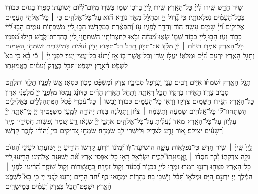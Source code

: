 {
שִׁ֣יר חָדָ֑שׁ שִׁ֥ירוּ לַ֝ייָ֗ כׇּל־הָאָֽרֶץ׃
שִׁ֣ירוּ לַ֭ייָ בָּרְכ֣וּ שְׁמ֑וֹ בַּשְּׂר֥וּ מִיּֽוֹם־לְ֝י֗וֹם יְשׁוּעָתֽוֹ׃
סַפְּר֣וּ בַגּוֹיִ֣ם כְּבוֹד֑וֹ בְּכׇל־הָ֝עַמִּ֗ים נִפְלְאוֹתָֽיו׃
כִּ֥י גָ֘ד֤וֹל יְיָ֣ וּמְהֻלָּ֣ל מְאֹ֑ד נוֹרָ֥א ה֗֝וּא עַל־כׇּל־אֱלֹהִֽים׃
כִּ֤י ׀ כׇּל־אֱלֹהֵ֣י הָעַמִּ֣ים אֱלִילִ֑ים וַ֝ייָ֗ שָׁמַ֥יִם עָשָֽׂה׃
הוֹד־וְהָדָ֥ר לְפָנָ֑יו עֹ֥ז וְ֝תִפְאֶ֗רֶת בְּמִקְדָּשֽׁוֹ׃
הָב֣וּ לַ֭ייָ מִשְׁפְּח֣וֹת עַמִּ֑ים הָב֥וּ לַ֝ייָ֗ כָּב֥וֹד וָעֹֽז׃
הָב֣וּ לַ֭ייָ כְּב֣וֹד שְׁמ֑וֹ שְׂאֽוּ־מִ֝נְחָ֗ה וּבֹ֥אוּ לְחַצְרוֹתָֽיו׃
הִשְׁתַּחֲו֣וּ לַ֭ייָ בְּהַדְרַת־קֹ֑דֶשׁ חִ֥ילוּ מִ֝פָּנָ֗יו כׇּל־הָאָֽרֶץ׃
אִמְר֤וּ בַגּוֹיִ֨ם ׀ יְ֘יָ֤ מָלָ֗ךְ אַף־תִּכּ֣וֹן תֵּ֭בֵל בַּל־תִּמּ֑וֹט יָדִ֥ין עַ֝מִּ֗ים בְּמֵישָׁרִֽים׃
יִשְׂמְח֣וּ הַ֭שָּׁמַיִם וְתָגֵ֣ל הָאָ֑רֶץ יִֽרְעַ֥ם הַ֝יָּ֗ם וּמְלֹאֽוֹ׃
יַעֲלֹ֣ז שָׂ֭דַי וְכׇל־אֲשֶׁר־בּ֑וֹ אָ֥ז יְ֝רַנְּנ֗וּ כׇּל־עֲצֵי־יָֽעַר׃
לִפְנֵ֤י יְיָ֨ ׀ כִּ֬י בָ֗א כִּ֥י בָא֮ לִשְׁפֹּ֢ט הָ֫אָ֥רֶץ יִשְׁפֹּֽט־תֵּבֵ֥ל בְּצֶ֑דֶק וְ֝עַמִּ֗ים בֶּאֱמוּנָתֽוֹ׃

תָּגֵ֣ל הָאָ֑רֶץ יִ֝שְׂמְח֗וּ אִיִּ֥ים רַבִּֽים׃
עָנָ֣ן וַעֲרָפֶ֣ל סְבִיבָ֑יו צֶ֥דֶק וּ֝מִשְׁפָּ֗ט מְכ֣וֹן כִּסְאֽוֹ׃
אֵ֭שׁ לְפָנָ֣יו תֵּלֵ֑ךְ וּתְלַהֵ֖ט סָבִ֣יב צָרָֽיו׃
הֵאִ֣ירוּ בְרָקָ֣יו תֵּבֵ֑ל רָאֲתָ֖ה וַתָּחֵ֣ל הָאָֽרֶץ׃
הָרִ֗ים כַּדּוֹנַ֗ג נָ֭מַסּוּ מִלִּפְנֵ֣י יְיָ֑ מִ֝לִּפְנֵ֗י אֲד֣וֹן כׇּל־הָאָֽרֶץ׃
הִגִּ֣ידוּ הַשָּׁמַ֣יִם צִדְק֑וֹ וְרָא֖וּ כׇל־הָעַמִּ֣ים כְּבוֹדֽוֹ׃
יֵבֹ֤שׁוּ ׀ כׇּל־עֹ֬בְדֵי פֶ֗סֶל הַמִּֽתְהַלְלִ֥ים בָּאֱלִילִ֑ים הִשְׁתַּחֲווּ־ל֗֝וֹ כׇּל־אֱלֹהִֽים׃
שָׁמְעָ֬ה וַתִּשְׂמַ֨ח ׀ צִיּ֗וֹן וַ֭תָּגֵלְנָה בְּנ֣וֹת יְהוּדָ֑ה לְמַ֖עַן מִשְׁפָּטֶ֣יךָ יְיָ׃
כִּֽי־אַתָּ֤ה יְיָ֗ עֶלְי֥וֹן עַל־כׇּל־הָאָ֑רֶץ מְאֹ֥ד נַ֝עֲלֵ֗יתָ עַל־כׇּל־אֱלֹהִֽים׃
אֹֽהֲבֵ֥י יְיָ֗ שִׂנְא֫וּ רָ֥ע שֹׁ֭מֵר נַפְשׁ֣וֹת חֲסִידָ֑יו מִיַּ֥ד רְ֝שָׁעִ֗ים יַצִּילֵֽם׃
א֭וֹר זָרֻ֣עַ לַצַּדִּ֑יק וּֽלְיִשְׁרֵי־לֵ֥ב שִׂמְחָֽה׃
שִׂמְח֣וּ צַ֭דִּיקִים בַּייָ֑ וְ֝הוֹד֗וּ לְזֵ֣כֶר קׇדְשֽׁוֹ׃

לַֽיְיָ֙ שִׁ֥ייָ֨ ׀ שִׁ֣יר חָ֭דָשׁ כִּֽי־נִפְלָא֣וֹת עָשָׂ֑ה הוֹשִׁיעָה־לּ֥וֹ יְ֝מִינ֗וֹ וּזְר֥וֹעַ קׇדְשֽׁוֹ׃
הוֹדִ֣יעַ יְיָ֭ יְשׁוּעָת֑וֹ לְעֵינֵ֥י הַ֝גּוֹיִ֗ם גִּלָּ֥ה צִדְקָתֽוֹ׃
זָ֘כַ֤ר חַסְדּ֨וֹ ׀ וֶ֥אֱֽמוּנָתוֹ֮ לְבֵ֢ית יִשְׂרָ֫אֵ֥ל רָא֥וּ כׇל־אַפְסֵי־אָ֑רֶץ אֵ֗֝ת יְשׁוּעַ֥ת אֱלֹהֵֽינוּ׃
הָרִ֣יעוּ לַ֭ייָ כׇּל־הָאָ֑רֶץ פִּצְח֖וּ וְרַנְּנ֣וּ וְזַמֵּֽרוּ׃
זַמְּר֣וּ לַייָ֣ בְּכִנּ֑וֹר בְּ֝כִנּ֗וֹר וְק֣וֹל זִמְרָֽה׃
בַּ֭חֲצֹ֣צְרוֹת וְק֣וֹל שׁוֹפָ֑ר הָ֝רִ֗יעוּ לִפְנֵ֤י ׀ הַמֶּ֬לֶךְ יְיָ׃
יִרְעַ֣ם הַ֭יָּם וּמְלֹא֑וֹ תֵּ֝בֵ֗ל וְיֹ֣שְׁבֵי בָֽהּ׃
נְהָר֥וֹת יִמְחֲאוּ־כָ֑ף יַ֗֝חַד הָרִ֥ים יְרַנֵּֽנוּ׃
לִ֥פְֽנֵי יְיָ֗ כִּ֥י בָא֮ לִשְׁפֹּ֢ט הָ֫אָ֥רֶץ יִשְׁפֹּֽט־תֵּבֵ֥ל בְּצֶ֑דֶק וְ֝עַמִּ֗ים בְּמֵישָׁרִֽים׃

}
